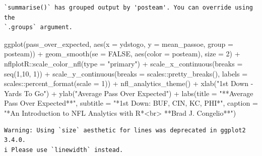 \documentclass[
  letterpaper,
]{krantz}
\newenvironment{Shaded}{\begin{snugshade}}{\end{snugshade}}
\newcommand{\AttributeTok}[1]{\textcolor[rgb]{0.40,0.45,0.13}{#1}}
\newcommand{\ConstantTok}[1]{\textcolor[rgb]{0.56,0.35,0.01}{#1}}
\newcommand{\DecValTok}[1]{\textcolor[rgb]{0.68,0.00,0.00}{#1}}
\newcommand{\FunctionTok}[1]{\textcolor[rgb]{0.28,0.35,0.67}{#1}}
\newcommand{\NormalTok}[1]{\textcolor[rgb]{0.00,0.23,0.31}{#1}}
\newcommand{\SpecialCharTok}[1]{\textcolor[rgb]{0.37,0.37,0.37}{#1}}
\newcommand{\StringTok}[1]{\textcolor[rgb]{0.13,0.47,0.30}{#1}}
\begin{document}
\begin{verbatim}
`summarise()` has grouped output by 'posteam'. You can override using the
`.groups` argument.
\end{verbatim}

\begin{Shaded}
\begin{Highlighting}[]
\FunctionTok{ggplot}\NormalTok{(pass\_over\_expected, }\FunctionTok{aes}\NormalTok{(}\AttributeTok{x =}\NormalTok{ ydstogo, }\AttributeTok{y =}\NormalTok{ mean\_passoe,}
                               \AttributeTok{group =}\NormalTok{ posteam)) }\SpecialCharTok{+}
  \FunctionTok{geom\_smooth}\NormalTok{(}\AttributeTok{se =} \ConstantTok{FALSE}\NormalTok{, }\FunctionTok{aes}\NormalTok{(}\AttributeTok{color =}\NormalTok{ posteam), }\AttributeTok{size =} \DecValTok{2}\NormalTok{) }\SpecialCharTok{+}
\NormalTok{  nflplotR}\SpecialCharTok{::}\FunctionTok{scale\_color\_nfl}\NormalTok{(}\AttributeTok{type =} \StringTok{"primary"}\NormalTok{) }\SpecialCharTok{+}
  \FunctionTok{scale\_x\_continuous}\NormalTok{(}\AttributeTok{breaks =} \FunctionTok{seq}\NormalTok{(}\DecValTok{1}\NormalTok{,}\DecValTok{10}\NormalTok{, }\DecValTok{1}\NormalTok{)) }\SpecialCharTok{+}
  \FunctionTok{scale\_y\_continuous}\NormalTok{(}\AttributeTok{breaks =}\NormalTok{ scales}\SpecialCharTok{::}\FunctionTok{pretty\_breaks}\NormalTok{(),}
                     \AttributeTok{labels =}\NormalTok{ scales}\SpecialCharTok{::}\FunctionTok{percent\_format}\NormalTok{(}\AttributeTok{scale =} \DecValTok{1}\NormalTok{)) }\SpecialCharTok{+}
  \FunctionTok{nfl\_analytics\_theme}\NormalTok{() }\SpecialCharTok{+}
  \FunctionTok{xlab}\NormalTok{(}\StringTok{"1st Down {-} Yards To Go"}\NormalTok{) }\SpecialCharTok{+}
  \FunctionTok{ylab}\NormalTok{(}\StringTok{"Average Pass Over Expected"}\NormalTok{) }\SpecialCharTok{+}
  \FunctionTok{labs}\NormalTok{(}\AttributeTok{title =} \StringTok{"**Average Pass Over Expected**"}\NormalTok{,}
       \AttributeTok{subtitle =} \StringTok{"*1st Down: BUF, CIN, KC, PHI*"}\NormalTok{,}
       \AttributeTok{caption =} \StringTok{"*An Introduction to NFL Analytics with R*\textless{}br\textgreater{}}
\StringTok{       **Brad J. Congelio**"}\NormalTok{)}
\end{Highlighting}
\end{Shaded}

\begin{verbatim}
Warning: Using `size` aesthetic for lines was deprecated in ggplot2 3.4.0.
i Please use `linewidth` instead.
\end{verbatim}
\end{document}
